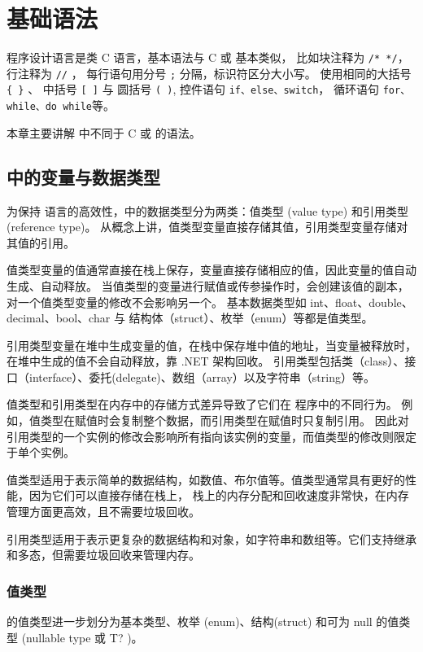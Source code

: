 
\chapter{ \cs 基础语法}

\cs 程序设计语言是类 C 语言，基本语法与 C 或 \cpp 基本类似，
比如块注释为 \verb|/* */|， 行注释为 \verb|//| ，
每行语句用分号 \verb|;| 分隔，\cs 标识符区分大小写。
\cs 使用相同的大括号 \verb|{ }| 、 中括号 \verb|[ ]| 与 圆括号 \verb|( )|,
控件语句 \verb|if、else、switch|，
循环语句 \verb|for、while、do while|等。

本章主要讲解 \cs 中不同于  C 或 \cpp 的语法。

\section{ \cs 中的变量与数据类型}

为保持 \cs 语言的高效性，\cs 中的数据类型分为两类：值类型 (value type) 和引用类型 (reference type)。
从概念上讲，值类型变量直接存储其值，引用类型变量存储对其值的引用。

值类型变量的值通常直接在栈上保存，变量直接存储相应的值，因此变量的值自动生成、自动释放。
当值类型的变量进行赋值或传参操作时，会创建该值的副本，对一个值类型变量的修改不会影响另一个。
基本数据类型如 int、float、double、decimal、bool、char 与 结构体（struct）、枚举（enum）等都是值类型。

引用类型变量在堆中生成变量的值，在栈中保存堆中值的地址，当变量被释放时，
在堆中生成的值不会自动释放，靠 .NET 架构回收。
引用类型包括类（class）、接口（interface）、委托(delegate)、数组（array）以及字符串（string）等。

值类型和引用类型在内存中的存储方式差异导致了它们在 \cs 程序中的不同行为。
例如，值类型在赋值时会复制整个数据，而引用类型在赋值时只复制引用。
因此对引用类型的一个实例的修改会影响所有指向该实例的变量，而值类型的修改则限定于单个实例。

值类型适用于表示简单的数据结构，如数值、布尔值等。值类型通常具有更好的性能，因为它们可以直接存储在栈上，
栈上的内存分配和回收速度非常快，在内存管理方面更高效，且不需要垃圾回收。

引用类型适用于表示更复杂的数据结构和对象，如字符串和数组等。它们支持继承和多态，但需要垃圾回收来管理内存。

\subsection{值类型}
\cs  的值类型进一步划分为基本类型、枚举 (enum)、结构(struct)
和可为 null 的值类型 (nullable type 或 T? )。

